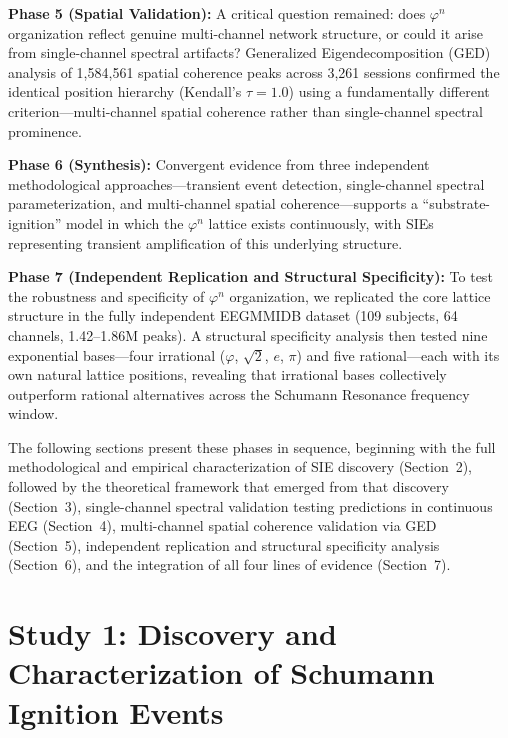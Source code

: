 \documentclass[11pt,a4paper]{article}
\newcommand{\phisym}{\varphi}
\begin{document}
\textbf{Phase 5 (Spatial Validation):} A critical question remained: does $\phisym^n$ organization reflect genuine multi-channel network structure, or could it arise from single-channel spectral artifacts? Generalized Eigendecomposition (GED) analysis of 1,584,561 spatial coherence peaks across 3,261 sessions confirmed the identical position hierarchy (Kendall's $\tau = 1.0$) using a fundamentally different criterion---multi-channel spatial coherence rather than single-channel spectral prominence.

\textbf{Phase 6 (Synthesis):} Convergent evidence from three independent methodological approaches---transient event detection, single-channel spectral parameterization, and multi-channel spatial coherence---supports a ``substrate-ignition'' model in which the $\phisym^n$ lattice exists continuously, with SIEs representing transient amplification of this underlying structure.

\textbf{Phase 7 (Independent Replication and Structural Specificity):} To test the robustness and specificity of $\phisym^n$ organization, we replicated the core lattice structure in the fully independent EEGMMIDB dataset (109 subjects, 64 channels, 1.42--1.86M peaks). A structural specificity analysis then tested nine exponential bases---four irrational ($\phisym$, $\sqrt{2}$, $e$, $\pi$) and five rational---each with its own natural lattice positions, revealing that irrational bases collectively outperform rational alternatives across the Schumann Resonance frequency window.

The following sections present these phases in sequence, beginning with the full methodological and empirical characterization of SIE discovery (Section~2), followed by the theoretical framework that emerged from that discovery (Section~3), single-channel spectral validation testing predictions in continuous EEG (Section~4), multi-channel spatial coherence validation via GED (Section~5), independent replication and structural specificity analysis (Section~6), and the integration of all four lines of evidence (Section~7).

\section{Study 1: Discovery and Characterization of Schumann Ignition Events}
\end{document}
